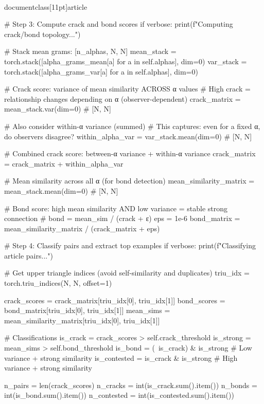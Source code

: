 \\documentclass[11pt]{article}
\begin{document}
\begin{CodeBlock}
{{{{{{{{        # Step 3: Compute crack and bond scores
        if verbose:
            print(f"\n[3/4] Computing crack/bond topology...")
        
        # Stack mean grams: [n_alphas, N, N]
        mean_stack = torch.stack([alpha_grams_mean[a] for a in self.alphas], dim=0)
        var_stack = torch.stack([alpha_grams_var[a] for a in self.alphas], dim=0)
        
        # Crack score: variance of mean similarity ACROSS α values
        # High crack = relationship changes depending on α (observer-dependent)
        crack_matrix = mean_stack.var(dim=0)  # [N, N]
        
        # Also consider within-α variance (summed)
        # This captures: even for a fixed α, do observers disagree?
        within_alpha_var = var_stack.mean(dim=0)  # [N, N]
        
        # Combined crack score: between-α variance + within-α variance
        crack_matrix = crack_matrix + within_alpha_var
        
        # Mean similarity across all α (for bond detection)
        mean_similarity_matrix = mean_stack.mean(dim=0)  # [N, N]
        
        # Bond score: high mean similarity AND low variance = stable strong connection
        # bond = mean_sim / (crack + ε)
        eps = 1e-6
        bond_matrix = mean_similarity_matrix / (crack_matrix + eps)
        
        # Step 4: Classify pairs and extract top examples
        if verbose:
            print(f"\n[4/4] Classifying article pairs...")
        
        # Get upper triangle indices (avoid self-similarity and duplicates)
        triu_idx = torch.triu_indices(N, N, offset=1)
        
        crack_scores = crack_matrix[triu_idx[0], triu_idx[1]]
        bond_scores = bond_matrix[triu_idx[0], triu_idx[1]]
        mean_sims = mean_similarity_matrix[triu_idx[0], triu_idx[1]]
        
        # Classifications
        is_crack = crack_scores > self.crack_threshold
        is_strong = mean_sims > self.bond_threshold
        is_bond = (~is_crack) & is_strong  # Low variance + strong similarity
        is_contested = is_crack & is_strong  # High variance + strong similarity
        
        n_pairs = len(crack_scores)
        n_cracks = int(is_crack.sum().item())
        n_bonds = int(is_bond.sum().item())
        n_contested = int(is_contested.sum().item())
        
}}}}}}}}
\end{CodeBlock}
\end{document}
